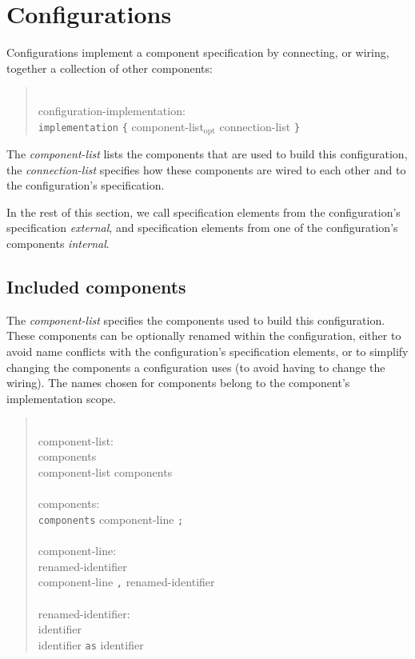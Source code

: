 \documentclass[11pt,letterpaper]{article}
\newcommand{\kw}[1]{{\tt #1}}
\newcommand{\opt}{$_{\mbox{opt}}$\xspace}
\newcommand{\grammarshift}{\vspace*{-.7cm}}
\newcommand{\grammarindent}{\hspace*{2cm}\= \\ \kill}
\begin{document}
\section{Configurations}
\label{sec:configuration}

Configurations implement a component specification by connecting, or wiring,
together a collection of other components:
\begin{quote} \grammarshift \em \begin{tabbing}
\grammarindent
configuration-implementation:\\
\>	\kw{implementation} \kw{\{} component-list\opt connection-list \kw{\}}\\
\end{tabbing} \end{quote}

The \emph{component-list} lists the components that are used to build this
configuration, the \emph{connection-list} specifies how these components
are wired to each other and to the configuration's specification.

In the rest of this section, we call specification elements from the
configuration's specification \emph{external},
and specification elements from one of the configuration's components
\emph{internal}.

\subsection{Included components}
\label{sec:config-components}

The \emph{component-list} specifies the components used to build this
configuration. These components can be optionally renamed within the
configuration, either to avoid name conflicts with the configuration's
specification elements, or to simplify changing the components a
configuration uses (to avoid having to change the wiring). The names
chosen for components belong to the component's implementation scope.

\begin{quote} \grammarshift \em \begin{tabbing}
\grammarindent
component-list:\\
\>	components\\
\>	component-list components\\
\\
components:\\
\>	\kw{components} component-line \kw{;}\\
\\
component-line:\\
\>	renamed-identifier\\
\>	component-line \kw{,} renamed-identifier\\
\\
renamed-identifier:\\
\>	identifier\\
\>	identifier \kw{as} identifier\\
\end{tabbing} \end{quote}
\end{document}
